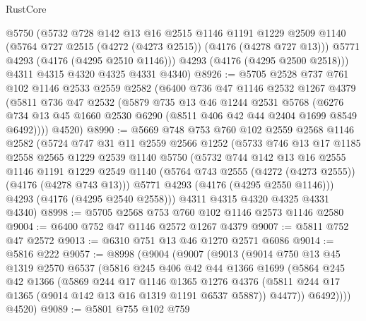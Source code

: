 \begin{lexlean}{RustCore}
\begin{coremodule}
        @5750
        (@5732
          @728
          @142
          @13
          @16
          @2515
          @1146
          @1191
          @1229
          @2509
          @1140
          (@5764 @727 @2515 (@4272 (@4273 @2515)) (@4176 (@4278 @727 @13)))
          @5771
          @4293
          (@4176 (@4295 @2510 @1146)))
        @4293
        (@4176 (@4295 @2500 @2518)))
      @4311
      @4315
      @4320
      @4325
      @4331
      @4340)
@8926 := @5705
    @2528
    @737
    @761
    @102
    @1146
    @2533
    @2559
    @2582
    (@6400
      @736
      @47
      @1146
      @2532
      @1267
      @4379
      (@5811
        @736
        @47
        @2532
        (@5879
          @735
          @13
          @46
          @1244
          @2531
          @5768
          (@6276 @734 @13 @45 @1660 @2530 @6290 (@8511 @406 @42 @44 @2404 @1699 @8549 @6492))))
      @4520)
@8990 := @5669
    @748
    @753
    @760
    @102
    @2559
    @2568
    @1146
    @2582
    (@5724
      @747
      @31
      @11
      @2559
      @2566
      @1252
      (@5733
        @746
        @13
        @17
        @1185
        @2558
        @2565
        @1229
        @2539
        @1140
        @5750
        (@5732
          @744
          @142
          @13
          @16
          @2555
          @1146
          @1191
          @1229
          @2549
          @1140
          (@5764 @743 @2555 (@4272 (@4273 @2555)) (@4176 (@4278 @743 @13)))
          @5771
          @4293
          (@4176 (@4295 @2550 @1146)))
        @4293
        (@4176 (@4295 @2540 @2558)))
      @4311
      @4315
      @4320
      @4325
      @4331
      @4340)
@8998 := @5705 @2568 @753 @760 @102 @1146 @2573 @1146 @2580
@9004 := @6400 @752 @47 @1146 @2572 @1267 @4379
@9007 := @5811 @752 @47 @2572
@9013 := @6310 @751 @13 @46 @1270 @2571 @6086
@9014 := @5816 @222
@9057 := @8998
    (@9004
      (@9007
        (@9013
          (@9014
            @750
            @13
            @45
            @1319
            @2570
            @6537
            (@5816
              @245
              @406
              @42
              @44
              @1366
              @1699
              (@5864
                @245
                @42
                @1366
                (@5869
                  @244
                  @17
                  @1146
                  @1365
                  @1276
                  @4376
                  (@5811 @244 @17 @1365 (@9014 @142 @13 @16 @1319 @1191 @6537 @5887))
                  @4477))
              @6492))))
      @4520)
@9089 := @5801
    @755
    @102
    @759

\end{coremodule}
\end{lexlean}
